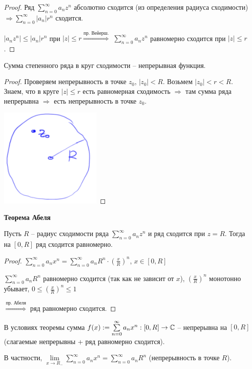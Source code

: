 \begin{proof}
    Ряд $\sum\limits_{n=0}^\infty a_nz^n$ абсолютно сходится (из определения радиуса сходимости) $\Rightarrow\sum\limits_{n=0}^\infty |a_n|r^n$ сходится.

    $|a_nz^n|\leq |a_n|r^n$ при $|z|\leq r\overset{\text{пр. Вейерш.}}{\Rightarrow}$ $\sum\limits_{n=0}^\infty a_nz^n$ равномерно сходится при $|z|\leq r$.
\end{proof}

\begin{corollary}
    Сумма степенного ряда в круг сходимости – непрерывная функция.
\end{corollary}

\begin{proof}
    Проверяем непрерывность в точке $z_0$, $|z_0|<R$. Возьмем $|z_0|<r<R$. Знаем, что в круге $|z|\leq r$ есть равномерная сходимость $\Rightarrow$ там сумма ряда непрерывна $\Rightarrow$ есть непрерывность в точке $z_0$.

    \includegraphics[width=0.2\linewidth]{images/10-05-3.png}
\end{proof}

\begin{theorem}
    \textbf{Теорема Абеля}

    Пусть $R$ – радиус сходимости ряда $\sum\limits_{n=0}^\infty a_nz^n$ и ряд сходится при $z=R$. Тогда на $[0, R]$ ряд сходится равномерно.
\end{theorem}
\begin{proof}
    $\sum\limits_{n=0}^\infty a_nx^n=\sum\limits_{n=0}^\infty a_nR^n\cdot (\frac{x}{R})^n$, $x\in [0, R]$

    $\sum\limits_{n=0}^\infty a_nR^n$ равномерно сходится (так как не зависит от $x$), $(\frac{x}{R})^n$ монотонно убывает, $0\leq (\frac{x}{R})^n\leq 1$
    
    $\overset{\text{пр. Абеля}}{\Rightarrow}$ ряд равномерно сходится.
\end{proof}

\begin{corollary}
    В условиях теоремы сумма $f(x):=\sum\limits_{n=0}^\infty a_nx^n: [0, R]\rightarrow \mathbb{C}$ – непрерывна на $[0, R]$ (слагаемые непрерывны + ряд равномерно сходится).

    В частности, $\lim\limits_{x\rightarrow R_-}\sum\limits_{n=0}^\infty a_nx^n=\sum\limits_{n=0}^\infty a_nR^n$ (непрерывность в точке $R$).
\end{corollary}

